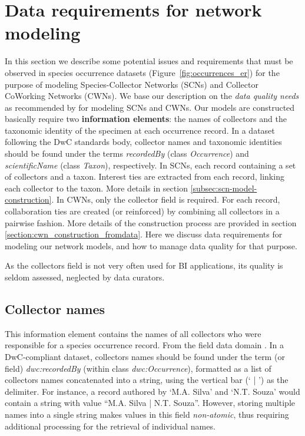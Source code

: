 \section{Data requirements for network modeling} %
\label{section:datareq}
In this section we describe some potential issues and requirements that must be observed in species occurrence datasets (Figure~\ref{fig:occurrences_er}) for the purpose of modeling Species-Collector Networks (SCNs) and Collector CoWorking Networks (CWNs).
We base our description on the \textit{data quality needs} as recommended by  for modeling SCNs and CWNs.
Our models are constructed basically require two \textbf{information elements}: the names of collectors and the taxonomic identity of the specimen at each occurrence record.
In a dataset following the DwC standards body, collector names and taxonomic identities should be found under the terms \textit{recordedBy} (class \textit{Occurrence}) and \textit{scientificName} (class \textit{Taxon}), respectively.
%
In SCNs, each record containing a set of collectors and a taxon. 
Interest ties are extracted from each record, linking each collector to the taxon.
More details in section \ref{subsec:scn-model-construction}.
%
In CWNs, only the collector field is required.
For each record, collaboration ties are created (or reinforced) by combining all collectors in a pairwise fashion.
More details of the construction process are provided in section \ref{section:cwn_construction_fromdata}.
%
Here we discuss data requirements for modeling our network models, and how to manage data quality for that purpose.

As the collectors field is not very often used for BI applications, its quality is seldom assessed, neglected by data curators.


\subsection{Collector names}\label{section:data_req_collector}
This information element contains the names of all collectors who were responsible for a species occurrence record.
From the field data domain \cite{Dalcin2005}.
In a DwC-compliant dataset, collectors names should be found under the term (or field) \textit{dwc:recordedBy} (within class \textit{dwc:Occurrence}), formatted as a list of collectors names concatenated into a string, using the vertical bar (` | ') as the delimiter.
For instance, a record authored by `M.A. Silva' and `N.T. Souza' would contain a string with value ``M.A. Silva | N.T. Souza''.
However, storing multiple names into a single string makes values in this field \textit{non-atomic}, thus requiring additional processing for the retrieval of individual names.

